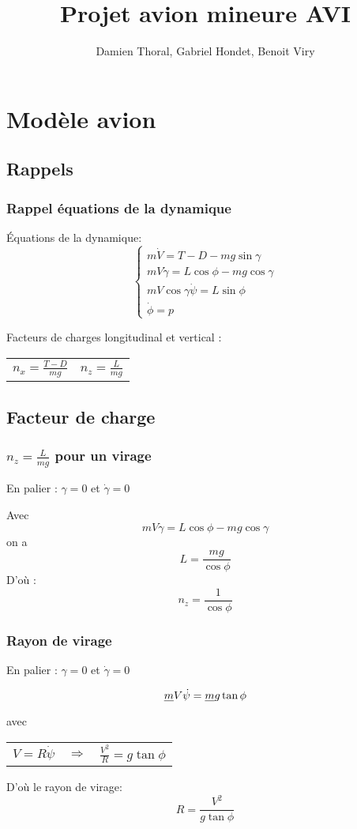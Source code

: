 \documentclass[footheight=2em]{beamer}
\title{Projet avion mineure AVI}
\author{Damien Thoral, Gabriel Hondet, Benoit Viry}
\date{}
\begin{document}
\frame{\titlepage}

\section{Modèle avion}
\subsection{Rappels}
\begin{frame}
    \frametitle{Rappel équations de la dynamique}\pause
    \'Equations de la dynamique:
    $$
    \left\{
    \begin{array}{l}
        m\dot{V} = T - D - mg\sin \gamma \\
        mV\dot{\gamma} = L\cos \phi - mg \cos \gamma \\
        mV \cos \gamma \dot{\psi} = L \sin \phi\\
        \dot{\phi} = p
    \end{array}
    \right.
    $$

    Facteurs de charges longitudinal et vertical :

    \begin{center}
        \begin{tabular}{cc}
            $n_x = \frac{T - D}{mg}$ & $n_z = \frac{L}{mg}$
        \end{tabular}
    \end{center}
\end{frame}

\subsection{Facteur de charge}
\begin{frame}
    \frametitle{$n_z = \frac{L}{mg}$ pour un virage}\pause
    En palier : $\gamma = 0$ et $\dot{\gamma} = 0$ \pause

    Avec $$mV\dot{\gamma} = L\cos \phi - mg \cos \gamma$$
    on a $$L=\frac{mg}{\cos \phi}$$ \pause
    D'où :$$\boxed{n_z = \frac{1}{\cos \phi}}$$
\end{frame}

\begin{frame}
    \frametitle{Rayon de virage}\pause
    En palier : $\gamma = 0$ et $\dot{\gamma} = 0$\pause

    $$\sout{m}V\dot{\psi} = \sout{m}g\tan \phi$$\pause
    avec

    \begin{center}
        \begin{tabular}{ccc}
            $V = R\dot{\psi}$ & $\Longrightarrow$ &
            $\frac{V^2}{R} = g \tan \phi$
        \end{tabular}
    \end{center}\pause

    D'où le rayon de virage:
    $$\boxed{R = \frac{V^2}{g\tan \phi}}$$
\end{frame}
\end{document}
